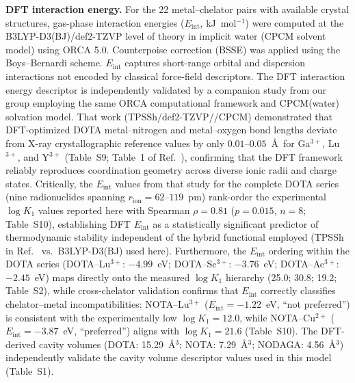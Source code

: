 \documentclass[journal=jacsat,manuscript=article]{achemso}
\begin{document}
\textbf{DFT interaction energy.}
For the 22 metal--chelator pairs with available crystal structures, gas-phase interaction
energies ($E_\mathrm{int}$, kJ~mol$^{-1}$) were computed at the
B3LYP-D3(BJ)\cite{Becke1993,LeeYangParr1988,Grimme2010}/def2-TZVP\cite{Weigend2005}
level of theory in implicit water (CPCM solvent model)\cite{Barone1998}
using ORCA 5.0.\cite{Neese2020}
Counterpoise correction (BSSE) was applied using the Boys--Bernardi scheme.
$E_\mathrm{int}$ captures short-range orbital and dispersion interactions not
encoded by classical force-field descriptors.\cite{Ozturk2024}
The DFT interaction energy descriptor is independently validated by a
companion study from our group employing the same ORCA computational framework
and CPCM(water) solvation model.\cite{Kim2026molpharm}
That work (TPSSh/def2-TZVP//CPCM) demonstrated that DFT-optimized DOTA
metal--nitrogen and metal--oxygen bond lengths deviate from X-ray crystallographic
reference values by only $0.01$--$0.05$~\AA\ for Ga$^{3+}$, Lu$^{3+}$, and
Y$^{3+}$ (Table~S9; Table~1 of Ref.~),
confirming that the DFT framework reliably reproduces coordination geometry
across diverse ionic radii and charge states.
Critically, the $E_\mathrm{int}$ values from that study for the complete DOTA
series (nine radionuclides spanning $r_\mathrm{ion} = 62$--$119$~pm) rank-order
the experimental $\log K_1$ values reported here with Spearman
$\rho = 0.81$ ($p = 0.015$, $n = 8$; Table~S10), establishing DFT
$E_\mathrm{int}$ as a statistically significant predictor of thermodynamic
stability independent of the hybrid functional employed
(TPSSh in Ref.~ vs.\ B3LYP-D3(BJ) used here).
Furthermore, the $E_\mathrm{int}$ ordering within the DOTA series
(DOTA--Lu$^{3+}$: $-4.99$~eV; DOTA--Sc$^{3+}$: $-3.76$~eV;
DOTA--Ac$^{3+}$: $-2.45$~eV\cite{Kim2026molpharm}) maps directly onto
the measured $\log K_1$ hierarchy (25.0; 30.8; 19.2; Table~S2), while
cross-chelator validation confirms that $E_\mathrm{int}$ correctly classifies
chelator--metal incompatibilities: NOTA--Lu$^{3+}$
($E_\mathrm{int} = -1.22$~eV, ``not preferred'')\cite{Kim2026molpharm}
is consistent with the experimentally low $\log K_1 = 12.0$, while
NOTA--Cu$^{2+}$ ($E_\mathrm{int} = -3.87$~eV, ``preferred'')\cite{Kim2026molpharm}
aligns with $\log K_1 = 21.6$ (Table~S10).
The DFT-derived cavity volumes\cite{Kim2026molpharm}
(DOTA: 15.29~\AA$^3$; NOTA: 7.29~\AA$^3$; NODAGA: 4.56~\AA$^3$)
independently validate the cavity volume descriptor values used in this
model (Table~S1).
\end{document}
